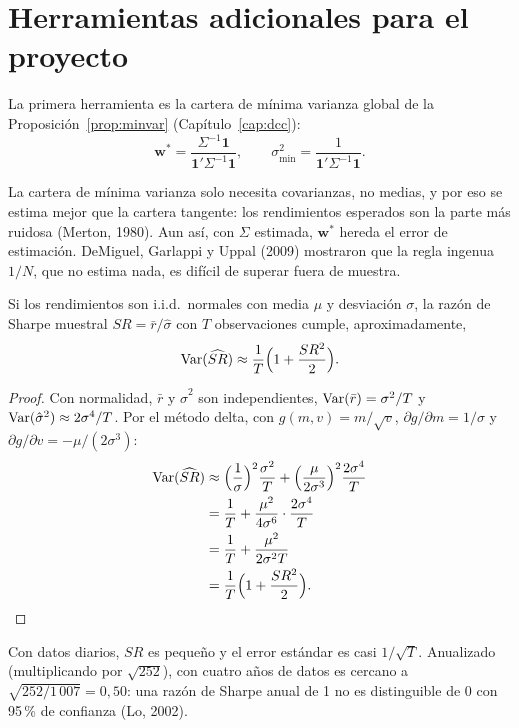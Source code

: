 \section{Herramientas adicionales para el proyecto}

La primera herramienta es la cartera de mínima varianza global de la Proposición~\ref{prop:minvar} (Capítulo~\ref{cap:dcc}):
\[
  \mathbf w^*=\frac{\Sigma^{-1}\mathbf 1}{\mathbf 1'\Sigma^{-1}\mathbf 1},\qquad \sigma^2_{\min}=\frac{1}{\mathbf 1'\Sigma^{-1}\mathbf 1}.
\]

La cartera de mínima varianza solo necesita covarianzas, no medias, y por eso se estima mejor que la cartera tangente: los
rendimientos esperados son la parte más ruidosa (Merton, 1980). Aun así, con $\Sigma$ estimada, $\mathbf w^*$ hereda el error de
estimación. DeMiguel, Garlappi y Uppal (2009) mostraron que la regla ingenua $1/N$, que no estima nada, es difícil de superar
fuera de muestra.

\begin{proposicion}\label{prop:sesharpe}
Si los rendimientos son i.i.d.\ normales con media $\mu$ y desviación $\sigma$, la razón de Sharpe muestral
$\widehat{SR}=\bar r/\hat\sigma$ con $T$ observaciones cumple, aproximadamente,
\[
  \operatorname{Var}(\widehat{SR})\approx\frac{1}{T}\Bigl(1+\frac{SR^2}{2}\Bigr).
\]
\end{proposicion}

\begin{proof}
Con normalidad, $\bar r$ y $\hat\sigma^2$ son independientes, $\operatorname{Var}(\bar r)=\sigma^2/T$ y $\operatorname{Var}(\hat\sigma^2)\approx2\sigma^4/T$. Por el método delta,
con $g(m,v)=m/\sqrt v$, $\partial g/\partial m=1/\sigma$ y $\partial g/\partial v=-\mu/(2\sigma^3)$:
\begin{align*}
  \operatorname{Var}(\widehat{SR}) &\approx \Bigl(\frac1\sigma\Bigr)^2\frac{\sigma^2}{T}+\Bigl(\frac{\mu}{2\sigma^3}\Bigr)^2\frac{2\sigma^4}{T}\\
                     &= \frac1T+\frac{\mu^2}{4\sigma^6}\cdot\frac{2\sigma^4}{T}\\
                     &= \frac1T+\frac{\mu^2}{2\sigma^2T}\\
                     &= \frac1T\Bigl(1+\frac{SR^2}{2}\Bigr).
\end{align*}
\end{proof}

Con datos diarios, $SR$ es pequeño y el error estándar es casi $1/\sqrt T$. Anualizado (multiplicando por $\sqrt{252}$), con cuatro años de
datos es cercano a $\sqrt{252/1\,007}=0{,}50$: una razón de Sharpe anual de 1 no es distinguible de 0 con 95\,\% de confianza (Lo, 2002).

